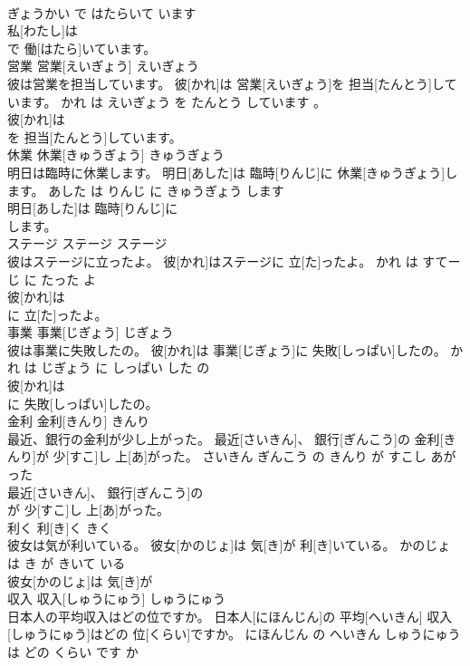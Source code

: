 \documentclass[8pt]{extreport}
\begin{document}
\begin{CJK}{UTF8}{min}
\\	ぎょうかい で はたらいて います	
\\	私[わたし]は
\\	で 働[はたら]いています。			
\\	営業	営業[えいぎょう]	えいぎょう	
\\	彼は営業を担当しています。	彼[かれ]は 営業[えいぎょう]を 担当[たんとう]しています。	かれ は えいぎょう を たんとう しています 。	
\\	彼[かれ]は
\\	を 担当[たんとう]しています。			
\\	休業	休業[きゅうぎょう]	きゅうぎょう	
\\	明日は臨時に休業します。	明日[あした]は 臨時[りんじ]に 休業[きゅうぎょう]します。	あした は りんじ に きゅうぎょう します	
\\	明日[あした]は 臨時[りんじ]に
\\	します。			
\\	ステージ	ステージ	ステージ	
\\	彼はステージに立ったよ。	彼[かれ]はステージに 立[た]ったよ。	かれ は すてーじ に たった よ	
\\	彼[かれ]は
\\	に 立[た]ったよ。			
\\	事業	事業[じぎょう]	じぎょう	
\\	彼は事業に失敗したの。	彼[かれ]は 事業[じぎょう]に 失敗[しっぱい]したの。	かれ は じぎょう に しっぱい した の	
\\	彼[かれ]は
\\	に 失敗[しっぱい]したの。			
\\	金利	金利[きんり]	きんり	
\\	最近、銀行の金利が少し上がった。	最近[さいきん]、 銀行[ぎんこう]の 金利[きんり]が 少[すこ]し 上[あ]がった。	さいきん ぎんこう の きんり が すこし あがった	
\\	最近[さいきん]、 銀行[ぎんこう]の
\\	が 少[すこ]し 上[あ]がった。			
\\	利く	利[き]く	きく	
\\	彼女は気が利いている。	彼女[かのじょ]は 気[き]が 利[き]いている。	かのじょ は き が きいて いる	
\\	彼女[かのじょ]は 気[き]が
\\	収入	収入[しゅうにゅう]	しゅうにゅう	
\\	日本人の平均収入はどの位ですか。	日本人[にほんじん]の 平均[へいきん] 収入[しゅうにゅう]はどの 位[くらい]ですか。	にほんじん の へいきん しゅうにゅう は どの くらい です か	

\end{CJK}
\end{document}
